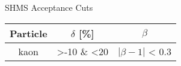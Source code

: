 \begin{Mtable}{SHMS Acceptance Cuts}
  \centering
  \begin{tabular}{|c|c|c|}
    \hline
    \textbf{Particle} & \textbf{$\delta$ [\%]} & \textbf{$\beta$} \\
    \hline    
    kaon & >-10 \& <20  & $\left|\beta-1\right|$ < 0.3 \\
    \hline
  \end{tabular}
  \caption{}
  \label{tab:3-3_shms_accep_cuts}
\end{Mtable}

